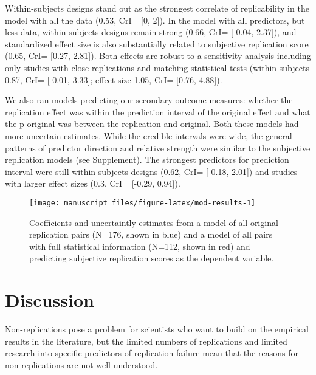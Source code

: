 \documentclass[
  english,
  a4paper,
]{article}
\begin{document}
Within-subjects designs stand out as the strongest correlate of replicability in the model with all the data (0.53, CrI= {[}0, 2{]}). In the model with all predictors, but less data, within-subjects designs remain strong (0.66, CrI= {[}-0.04, 2.37{]}), and standardized effect size is also substantially related to subjective replication score (0.65, CrI= {[}0.27, 2.81{]}). Both effects are robust to a sensitivity analysis including only studies with close replications and matching statistical tests (within-subjects 0.87, CrI= {[}-0.01, 3.33{]}; effect size 1.05, CrI= {[}0.76, 4.88{]}).

We also ran models predicting our secondary outcome measures: whether the replication effect was within the prediction interval of the original effect and what the p-original was between the replication and original. Both these models had more uncertain estimates. While the credible intervals were wide, the general patterns of predictor direction and relative strength were similar to the subjective replication models (see Supplement). The strongest predictors for prediction interval were still within-subjects designs (0.62, CrI= {[}-0.18, 2.01{]}) and studies with larger effect sizes (0.3, CrI= {[}-0.29, 0.94{]}).

\begin{figure}[ht]
\texttt{[image: manuscript\_files/figure-latex/mod-results-1]} \caption{Coefficients and uncertaintly estimates from a model of all original-replication pairs (N=176, shown in blue) and a model of all pairs with full statistical information (N=112, shown in red) and predicting subjective replication scores as the dependent variable. }\label{fig:mod-results}
\end{figure}

\hypertarget{discussion}{%
\section{Discussion}\label{discussion}}

Non-replications pose a problem for scientists who want to build on the empirical results in the literature, but the limited numbers of replications and limited research into specific predictors of replication failure mean that the reasons for non-replications are not well understood.
\end{document}
